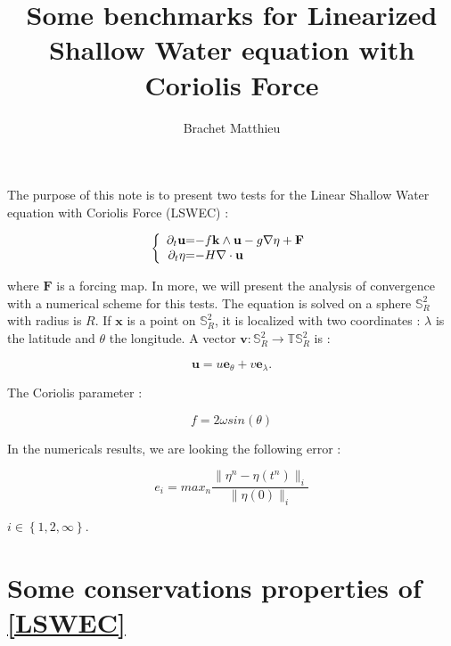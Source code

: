 \documentclass[10pt,a4paper]{amsart}
\author{Brachet Matthieu}
\title{Some benchmarks for Linearized Shallow Water equation with Coriolis Force}
\begin{document}
\maketitle

The purpose of this note is to present two tests for the Linear Shallow Water equation with Coriolis Force (LSWEC) :

\begin{equation}
\label{LSWEC}
\left\lbrace
\begin{array}{r @{=} l}
\partial_t \mathbf{u} & -f \mathbf{k} \wedge \mathbf{u} - g \nabla \eta + \mathbf{F} \\
\partial_t \eta & -H \nabla \cdot \mathbf{u} 
\end{array}
\right.
\end{equation}

where $\mathbf{F}$ is a forcing map. In more, we will present the analysis of convergence with a numerical scheme for this tests.
The equation is solved on a sphere $\mathbb{S}_R^2$ with radius is $R$. If $\mathbf{x}$ is a point on $\mathbb{S}_R^2$, it is localized with two coordinates : $\lambda$ is the latitude and $\theta$ the longitude. A vector $\mathbf{v} : \mathbb{S}_R^2 \rightarrow \mathbb{T}\mathbb{S}_R^2$ is :

$$\mathbf{u} = u \mathbf{e}_{\theta} + v \mathbf{e}_{\lambda}.$$ 

The Coriolis parameter :

\begin{equation}
f=2 \omega sin ( \theta )
\label{coriolis_parameter}
\end{equation}

In the numericals results, we are looking the following error :

$$e_{i} = max_n \dfrac{\| \eta^n - \eta(t^n) \|_{i}}{\| \eta(0) \|_{i}}$$

$i \in \left\lbrace 1, 2, \infty \right\rbrace$.

\section{Some conservations properties of \eqref{LSWEC}}
\end{document}

